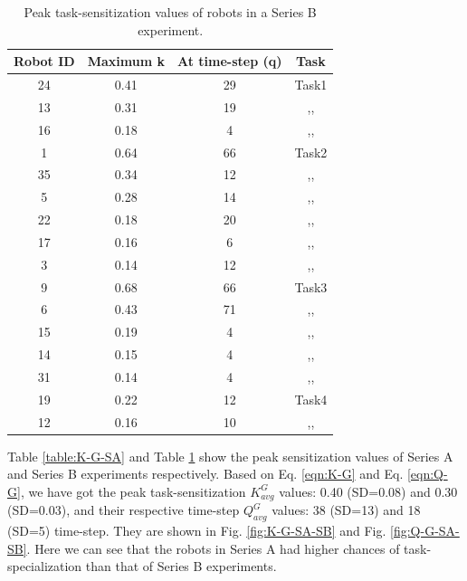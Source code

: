 \documentclass[final,5p,times,twocolumn]{elsarticle}
\begin{document}
\begin{table}
\centering
\caption{Peak task-sensitization values of robots in a Series B experiment.}
\begin{tabular}{|c|c|c|c|}
\hline \textbf{Robot ID} & \textbf{Maximum k} & \textbf{At time-step (q)} & \textbf{Task} \\
\hline 24 & 0.41 & 29 & Task1\\
\hline 13 & 0.31 & 19 & ,,\\
\hline 16 & 0.18 & 4 & ,,\\
\hline 1 & 0.64 & 66 & Task2\\
\hline 35 & 0.34 & 12 & ,,\\
\hline 5 & 0.28 & 14 & ,,\\
\hline 22 & 0.18 & 20 & ,,\\
\hline 17 & 0.16 & 6 & ,,\\
\hline 3 & 0.14 & 12 & ,,\\
\hline 9 & 0.68 & 66 & Task3\\
\hline 6 & 0.43 & 71 & ,,\\
\hline 15 & 0.19 & 4 & ,,\\
\hline 14 & 0.15 & 4 & ,,\\
\hline 31 & 0.14 & 4 & ,,\\
\hline 19 & 0.22 & 12 & Task4\\
\hline 12 & 0.16 & 10 & ,,\\
\hline 
\end{tabular} 
\label{table:K-G-SB}
\end{table}
Table \ref{table:K-G-SA} and Table \ref{table:K-G-SB} show the peak sensitization values of Series A and Series B experiments respectively.  Based on Eq. \ref{eqn:K-G} and Eq. \ref{eqn:Q-G}, we have got the peak task-sensitization $K^G_{avg} 
$ values: 0.40 (SD=0.08)  and 0.30 (SD=0.03), and their respective time-step $Q^G_{avg}$ values: 38 (SD=13) and 18 (SD=5) time-step.  They are shown in Fig. \ref{fig:K-G-SA-SB} and Fig. \ref{fig:Q-G-SA-SB}. Here we can see that the robots in Series A had higher chances of task-specialization than that of Series B experiments.
\end{document}
